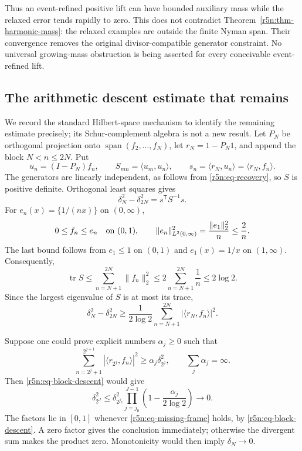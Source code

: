 \documentclass[11pt,a4paper]{article}
\theoremstyle{definition}\newtheorem{definition}[theorem]{Definition}
\theoremstyle{remark}\newtheorem{remark}[theorem]{Remark}
\numberwithin{equation}{section}
\begin{document}
Thus an event-refined positive lift can have bounded auxiliary
mass while the relaxed error tends rapidly to zero.
This does not contradict Theorem~\ref{r5n:thm-harmonic-mass}:
the relaxed examples are outside the finite Nyman span.
Their convergence removes the original divisor-compatible
generator constraint. No universal growing-mass obstruction is
being asserted for every conceivable event-refined lift.

\subsection{The arithmetic descent estimate that remains}
\label{r5n:subsec-descent}

We record the standard Hilbert-space mechanism to identify the
remaining estimate precisely; its Schur-complement algebra is
not a new result.
Let \(P_N\) be orthogonal projection onto
\(\operatorname{span}(f_2,\ldots,f_N)\), let \(r_N=1-P_N1\),
and append the block \(N<n\le2N\). Put
\[
 u_n=(I-P_N)f_n,\qquad
 S_{mn}=\langle u_m,u_n\rangle,\qquad
 s_n=\langle r_N,u_n\rangle=\langle r_N,f_n\rangle.
\]
The generators are linearly independent, as follows from
\eqref{r5n:eq-recovery}, so \(S\) is positive definite.
Orthogonal least squares gives
\begin{equation}
\label{r5n:eq-schur-descent}
 \delta_N^2-\delta_{2N}^2=s^{\mathsf T}S^{-1}s.
\end{equation}
For \(e_n(x)=\{1/(nx)\}\) on \((0,\infty)\),
\[
 0\le f_n\le e_n\quad\hbox{on }(0,1),\qquad
 \|e_n\|_{L^2(0,\infty)}^2=\frac{\|e_1\|_2^2}{n}\le\frac2n.
\]
The last bound follows from \(e_1\le1\) on \((0,1)\) and
\(e_1(x)=1/x\) on \((1,\infty)\). Consequently,
\[
 \operatorname{tr}S
 \le\sum_{n=N+1}^{2N}\|f_n\|_2^2
 \le2\sum_{n=N+1}^{2N}\frac1n
 \le2\log2.
\]
Since the largest eigenvalue of \(S\) is at most its trace,
\begin{equation}
\label{r5n:eq-block-descent}
 \delta_N^2-\delta_{2N}^2
 \ge\frac1{2\log2}
       \sum_{n=N+1}^{2N}|\langle r_N,f_n\rangle|^2.
\end{equation}

Suppose one could prove explicit numbers \(\alpha_j\ge0\) such
that
\begin{equation}
\label{r5n:eq-missing-frame}
 \sum_{n=2^j+1}^{2^{j+1}}
       |\langle r_{2^j},f_n\rangle|^2
 \ge\alpha_j\delta_{2^j}^2,
 \qquad \sum_j\alpha_j=\infty.
\end{equation}
Then \eqref{r5n:eq-block-descent} would give
\[
 \delta_{2^J}^2
 \le\delta_{2^{j_0}}^2
       \prod_{j=j_0}^{J-1}
          \left(1-\frac{\alpha_j}{2\log2}\right)
 \longrightarrow0.
\]
The factors lie in \([0,1]\) whenever
\eqref{r5n:eq-missing-frame} holds, by
\eqref{r5n:eq-block-descent}. A zero factor gives the conclusion
immediately; otherwise the divergent sum makes the product zero.
Monotonicity would then imply \(\delta_N\to0\).
\end{document}
